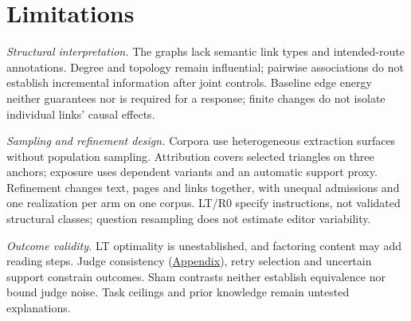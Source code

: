 \section{Limitations}
\label{sec:limitations}
\textit{Structural interpretation.}
The graphs lack semantic link types and intended-route annotations. Degree and
topology remain influential; pairwise associations do not establish incremental
information after joint controls. Baseline edge energy neither guarantees nor is required for a response;
finite changes do not isolate individual links' causal effects.

\textit{Sampling and refinement design.}
Corpora use heterogeneous extraction surfaces without population sampling.
Attribution covers selected triangles on three anchors; exposure uses dependent
variants and an automatic support proxy. Refinement changes text, pages and links
together, with unequal admissions and one realization per arm on one corpus.
LT/R0 specify instructions, not validated structural classes; question resampling
does not estimate editor variability.

\textit{Outcome validity.}
LT optimality is unestablished, and factoring content may add reading steps.
Judge consistency (\hyperref[sec:review-appendix]{Appendix}), retry selection and
uncertain support constrain outcomes. Sham contrasts neither establish
equivalence nor bound judge noise. Task ceilings and prior knowledge remain
untested explanations.
